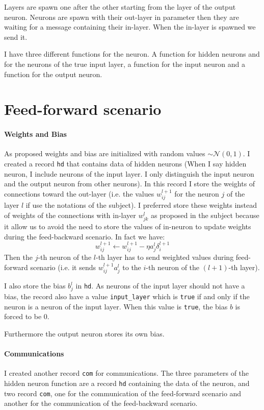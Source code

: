\documentclass[12pt]{article}
\begin{document}
Layers are spawn one after the other starting from the layer of the output neuron. Neurons are spawn with their out-layer in parameter then they are waiting for a message containing their in-layer. When the in-layer is spawned we send it.

I have three different functions for the neuron. A function for hidden neurons and for the neurons of the true input layer, a function for the input neuron and a function for the output neuron.

\section{Feed-forward scenario}

\paragraph{Weights and Bias}
As proposed weights and bias are initialized with random values $\sim \mathcal{N}(0, 1)$. I created a record \verb|hd| that contains data of hidden neurons (When I say hidden neuron, I include neurons of the input layer. I only distinguish the input neuron and the output neuron from other neurons). In this record I store the weights of connections toward the out-layer (i.e. the values $w_{ij}^{l+1}$ for the neuron $j$ of the layer $l$ if use the notations of the subject). I preferred store these weights instead of weights of the connections with in-layer $w_{jk}^l$ as proposed in the subject because it allow us to avoid the need to store the values of in-neuron to update weights during the feed-backward scenario. In fact we have:
$$ w_{ij}^{l+1} \gets w_{ij}^{l+1} - \eta a_j^l \delta_i^{l+1} $$
Then the $j$-th neuron of the $l$-th layer has to send weighted values during feed-forward scenario (i.e. it sends $w_{ij}^{l+1} a_j^l$ to the $i$-th neuron of the $(l+1)$-th layer).

I also store the bias $b_j^l$ in \verb|hd|. As neurons of the input layer should not have a bias, the record also have a value \verb|input_layer| which is \verb|true| if and only if the neuron is a neuron of the input layer. When this value is \verb|true|, the bias $b$ is forced to be 0.

Furthermore the output neuron stores its own bias.

\paragraph{Communications}
I created another record \verb|com| for communications. The three parameters of the hidden neuron function are a record \verb|hd| containing the data of the neuron, and two record \verb|com|, one for the communication of the feed-forward scenario and another for the communication of the feed-backward scenario.
\end{document}
